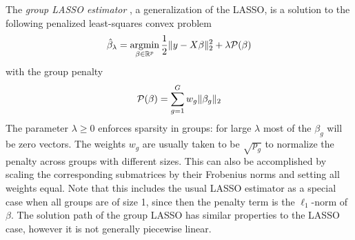 \documentclass{imsart}
\newcommand{\argmin}{\mathop{\mathrm{argmin}}}
\newcommand{\real}{\mathbb{R}}
\begin{document}
The \emph{group LASSO estimator} \citep{grouplasso,bakin:grouplasso},
a generalization of the LASSO, is a solution to the following penalized
least-squares convex problem
\begin{equation}
\begin{aligned}
\label{eq:gsoln}
\displaystyle \hat \beta_\lambda = \argmin_{\beta \in \real^p} \frac{1}{2} \| y - X \beta \|_2^2 +
   \lambda {\cal P}(\beta) \\
\end{aligned}
\end{equation}
with the group penalty
\begin{equation}
  \begin{aligned}
  \label{eq:gpen}
    {\cal P}(\beta)&= \sum_{g=1}^G w_g \| \beta_g \|_2 \\
  \end{aligned}
\end{equation}
The parameter $\lambda \geq 0$ enforces sparsity in groups: for large
$\lambda$ most of the $\beta_g$ will be zero vectors. The weights
$w_g$ are usually taken to be $\sqrt {p_g}$ to normalize the penalty
across groups with different sizes.  This can also be accomplished
by scaling the corresponding submatrices by their Frobenius norms
and setting all weights equal.
Note that this includes the usual LASSO estimator as a
special case when all groups are of size 1, since then the
penalty term is the $\ell_1$-norm of $\beta$. The solution path of the group
LASSO has similar properties to the LASSO case, however it is not
generally piecewise linear.
\end{document}
